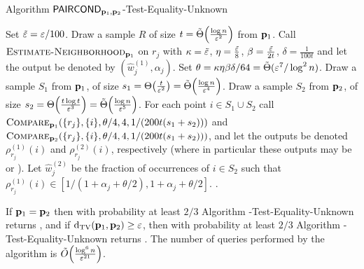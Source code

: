 \begin{algorithm}[ht!]
\label{alg:test-equality}
\caption{Algorithm {\sc ${\sf PAIRCOND}_{\mathbf{p}_1,\mathbf{p}_2}$-Test-Equality-Unknown}}
\begin{algorithmic}[1]
\State Set $\tilde{\varepsilon} = \varepsilon/100$.
\State Draw a sample $R$ of size
$t= \tilde{\Theta}\!\left(\frac{\log n}{\varepsilon^2}\right)$
from $\mathbf{p}_1$.
  \State\label{st:call-est-n}
     Call $\mbox{\sc Estimate-Neighborhood}_{\mathbf{p}_1}$ on $r_j$ with
    $\kappa=\tilde{\varepsilon}$, $\eta=\frac{\tilde{\varepsilon}}{8}$,
    $\beta=\frac{\tilde{\varepsilon}}{2t}$, $\delta=\frac{1}{100t}$ and
    let the output be denoted by $(\hat{w}^{(1)}_j,\alpha_j)$.
  \State Set $\theta = \kappa\eta\beta\delta/64 = \tilde{\Theta}(\varepsilon^7/\log^2 n)$.
  \State Draw a sample $S_1$ from $\mathbf{p}_1$,
    of size $s_1= \Theta\!\left(\frac{t}{\varepsilon^2}\right)
                  = \tilde{\Theta}\!\left(\frac{\log n}{\varepsilon^4}\right)$.
  \State Draw a sample $S_2$ from $\mathbf{p}_2$,
    of size $s_2= \Theta\!\left(\frac{t\log t}{\varepsilon^3}\right)
                   = \tilde{\Theta}\!\left(\frac{\log n}{\varepsilon^5}\right)$.
  \State\label{st:call-compare}
     For each point $i \in S_1\cup S_2$
     call $\mbox{\sc Compare}_{\mathbf{p}_1}(\{r_j\},\{i\},\theta/4,4,1/(200t(s_1+s_2)))$
     and $\mbox{\sc Compare}_{\mathbf{p}_2}(\{r_j\},\{i\},\theta/4,4,1/(200t(s_1+s_2)))$,
       and let the outputs be denoted $\rho^{(1)}_{r_j}(i)$ and
       $\rho^{(2)}_{r_j}(i)$, respectively (where in particular these
       outputs may be \high or \low).
  \State Let $\hat{w}^{(2)}_j$ be the fraction of occurrences of $i\in S_2$
      such that $\rho^{(1)}_{r_j}(i) \in [1/(1+\alpha_j+\theta/2),1+\alpha_j+\theta/2]$.
      \State \Return \reject
  \EndIf
    \State\Return \reject
  \EndIf
\EndFor
\State \Return \accept.
\end{algorithmic}
\end{algorithm}

\begin{theorem} 
If $\mathbf{p}_1 = \mathbf{p}_2$ then with probability at least $2/3$
Algorithm {\sc \PCOND-Test-Equality-Unknown} returns
\accept, and if {$\operatorname{d}_{\textrm{TV}}(\mathbf{p}_1,\mathbf{p}_2) \geq \varepsilon$}, then
with probability at least $2/3$
Algorithm {\sc \PCOND-Test-Equality-Unknown} returns
\reject.
The number of \PCOND queries performed by the
algorithm is
$\tildeO{\frac{\log^6 n}{\eps^{21}}}$.
\end{theorem}

